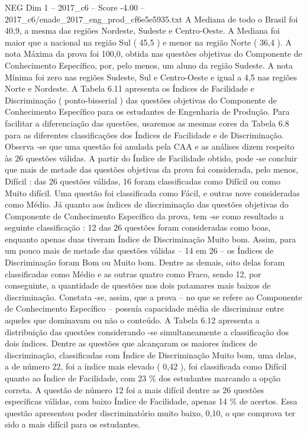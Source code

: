 \begin{textsample}{NEG Dim 1 – 2017\_c6 – Score -4.00 – 2017\_c6/enade\_2017\_eng\_prod\_cf6e5e5935.txt}
A Mediana de todo o Brasil foi 40,9, a mesma das regiões Nordeste, Sudeste e Centro-Oeste.
A Mediana foi maior que a nacional na região Sul ( 45,5 ) e menor na região Norte ( 36,4 ).
A nota Máxima da prova foi 100,0, obtida nas questões objetivas do Componente de Conhecimento Específico, por, pelo menos, um aluno da região Sudeste.
A nota Mínima foi zero nas regiões Sudeste, Sul e Centro-Oeste e igual a 4,5 nas regiões Norte e Nordeste.
A Tabela 6.11 apresenta os Índices de Facilidade e Discriminação ( ponto-bisserial ) das questões objetivas do Componente de Conhecimento Específico para os estudantes de Engenharia de Produção.
Para facilitar a diferenciação das questões, usaremos as mesmas cores da Tabela 6.8 para as diferentes classificações dos Índices de Facilidade e de Discriminação.
Observa -se que uma questão foi anulada pela CAA e as análises dizem respeito às 26 questões válidas.
A partir do Índice de Facilidade obtido, pode -se concluir que mais de metade das questões objetivas da prova foi considerada, pelo menos, Difícil : das 26 questões válidas, 16 foram classificadas como Difícil ou como Muito difícil.
Uma questão foi classificada como Fácil, e outras nove consideradas como Médio.
Já quanto aos índices de discriminação das questões objetivas do Componente de Conhecimento Específico da prova, tem -se como resultado a seguinte classificação : 12 das 26 questões foram consideradas como boas, enquanto apenas duas tiveram Índice de Discriminação Muito bom.
Assim, para um pouco mais de metade das questões válidas – 14 em 26 – os Índices de Discriminação foram Bom ou Muito bom.
Dentre as demais, oito delas foram classificadas como Médio e as outras quatro como Fraco, sendo 12, por conseguinte, a quantidade de questões nos dois patamares mais baixos de discriminação.
Constata -se, assim, que a prova – no que se refere ao Componente de Conhecimento Específico – possuía capacidade média de discriminar entre aqueles que dominavam ou não o conteúdo.
A Tabela 6.12 apresenta a distribuição das questões considerando -se simultaneamente a classificação dos dois índices.
Dentre as questões que alcançaram os maiores índices de discriminação, classificadas com Índice de Discriminação Muito bom, uma delas, a de número 22, foi a índice mais elevado ( 0,42 ), foi classificada como Difícil quanto ao Índice de Facilidade, com 23 \% dos estudantes marcando a opção correta.
A questão de número 12 foi a mais difícil dentre as 26 questões específicas válidas, com baixo Índice de Facilidade, apenas 14 \% de acertos.
Essa questão apresentou poder discriminatório muito baixo, 0,10, o que comprova ter sido a mais difícil para os estudantes.

\end{textsample}
